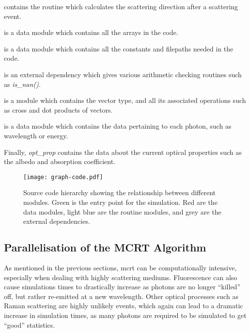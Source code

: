  contains the routine which calculates the scattering direction after a scattering event.

 is a data module which contains all the arrays in the code.

 is a data module which contains all the constants and filepaths needed in the code.

 is an external dependency which gives various arithmetic checking routines such as \textit{is_nan()}.

 is a module which contains the vector type, and all its associated operations such as cross and dot products of vectors.

 is a data module which contains the data pertaining to each photon, such as wavelength or energy.

\noindent Finally, {\color{red} \textit{opt_prop}} contains the data about the current optical properties such as the albedo and absorption coefficient.


\begin{figure}[!htbp]
	\centering
	\texttt{[image: graph-code.pdf]}
	\caption{Source code hierarchy showing the relationship between different modules. Green is the entry point for the simulation. Red are the data modules, light blue are the routine modules, and grey are the external dependencies.}
	\label{fig:codegraph}
\end{figure}



\subsection*{Parallelisation of the MCRT Algorithm}\label{sec:parasec}

As mentioned in the previous sections, \gls*{mcrt} can be computationally intensive, especially when dealing with highly scattering mediums. Fluorescence can also cause simulations times to drastically increase as photons are no longer ``killed'' off, but rather re-emitted at a new wavelength. Other optical processes such as Raman scattering are highly unlikely events, which again can lead to a dramatic increase in simulation times, as many photons are required to be simulated to get ``good'' statistics.

